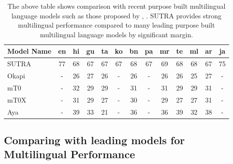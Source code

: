 \documentclass{article}
\begin{document}
\begin{table}[tb]
\setlength{\abovecaptionskip}{10pt} %
\setlength{\belowcaptionskip}{5pt} %
\centering

    \begin{tabular}{lcccccccccccc}
        \toprule
        \textbf{Model Name} & \textbf{en} & \textbf{hi} & \textbf{gu} & \textbf{ta} & \textbf{ko} & \textbf{bn} & \textbf{pa} & \textbf{mr} & \textbf{te} & \textbf{ml} & \textbf{ar} & \textbf{ja} \\
        \midrule
        SUTRA & 77 & 68 & 67 & 67 & 67 & 68 & 67 & 69 & 68 & 68 & 67 & 75 \\
                Okapi & - & 26 & 27 & 26 & - & 26 & - & 26 & 26 & 25 & 27 & - \\
        mT0 & - & 32 & 29 & 29 & - & 31 & - & 31 & 29 & 29 & 31 & - \\
        mT0X & - & 31 & 29 & 27 & - & 30 & - & 29 & 27 & 27 & 31 & - \\
        Aya & - & 39 & 33 & 21 & - & 36 & - & 36 & 39 & 32 & 38 & - \\
        \bottomrule
    \end{tabular}

  \caption{
 The above table shows comparison with recent purpose built multilingual language models such as those proposed by \citet{ustun2024aya}, \citet{lai2023okapi}. SUTRA provides strong multilingual performance compared to many leading purpose built multilingual language models by significant margin.  }

\label{table:purposebuilt_mmlu}
\end{table}

 

\subsection{Comparing with leading models for Multilingual Performance}

 
\end{document}
